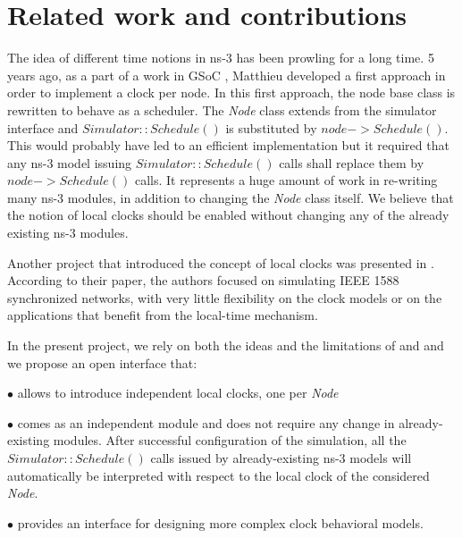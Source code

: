 \documentclass[times, twoside, watermark]{zHenriquesLab-StyleBioRxiv}
\begin{document}
\section*{Related work and contributions}
The idea of different time notions in ns-3 has been prowling for a long time. 
5 years ago, as a part of a work in GSoC \cite{gsoc}, Matthieu developed a first approach in order to implement a clock per node. 
In this first approach, the node base class is rewritten to behave as a scheduler. 
The \textit{Node} class extends from the simulator interface and \textit{\(Simulator::Schedule()\)} is substituted by \textit{\(node->Schedule()\)}. 
This would probably have led to an efficient implementation but it required that any ns-3 model issuing \textit{\(Simulator::Schedule()\)} calls shall replace them by \textit{\(node->Schedule()\)} calls.
It represents a huge amount of work in re-writing many ns-3 modules, in addition to changing the \textit{Node} class itself. 
We believe that the notion of local clocks should be enabled without changing any of the already existing ns-3 modules. 

Another project that introduced the concept of local clocks was presented in \cite{IEEE1588Ns3}. 
According to their paper, the authors focused on 
simulating IEEE 1588 synchronized networks, with very little flexibility on the clock models or on the applications that benefit from the local-time mechanism. 

In the present project, we rely on both the ideas and the limitations of \cite{gsoc} and \cite{IEEE1588Ns3} and we propose an open interface that: 

$\bullet$ allows to introduce independent local clocks, one per \textit{Node}

$\bullet$ comes as an independent module and does not require any change in already-existing modules. After successful configuration of the simulation, all the \textit{\(Simulator::Schedule()\)} calls issued by already-existing ns-3 models will automatically be interpreted with respect to the local clock of the considered \textit{Node}.

$\bullet$ provides an interface for designing more complex clock behavioral models.
\end{document}
